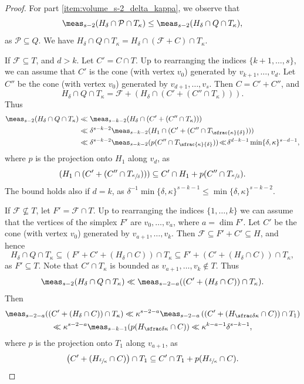 \begin{proof}
For part \eqref{item:volume_s-2_delta_kappa}, we observe that
\[
\meas_{s-2}(H_\delta\cap \mathcal P \cap T_\kappa) \leq \meas_{s-2}(H_\delta\cap Q \cap T_\kappa),
\]
as $\mathcal P\subseteq Q$.
We have
$
H_\delta\cap Q\cap T_\kappa=H_\delta\cap (\mathcal F+C)\cap T_\kappa.
$

If $\mathcal F\subseteq T$, and $d>k$. Let $C'=C\cap T$. Up to rearranging the indices $\{k+1,\dots,s\}$, we can assume that $C'$ is the cone (with vertex $v_0$) generated by $v_{k+1},\dots,v_{d}$. Let $C''$ be the cone (with vertex $v_0$) generated by $v_{d+1},\dots,v_s$. Then $C=C'+C''$, and
\[
H_\delta\cap Q\cap T_\kappa=\mathcal F+(H_\delta\cap (C'+(C''\cap T_\kappa))).
\]
Thus
\begin{align*}
\meas_{s-2}(H_\delta\cap Q\cap T_\kappa)
&\ll\meas_{s-k-2}(H_\delta\cap (C'+(C''\cap T_\kappa)))\\
&\ll \delta^{s-k-2}\meas_{s-k-2}(H_1\cap (C'+(C''\cap T_{\sfrac{\kappa}{\delta}})))\\
&\ll \delta^{s-k-2}\meas_{s-k-2}(p(C''\cap T_{\sfrac{\kappa}{\delta}}))
\!\ll\! \delta^{d-k-1}\min\{\delta,\kappa\}^{s-d-1},
\end{align*}
where $p$ is the projection onto $H_1$ along $v_{d}$,
as \[
(H_1\cap (C'+(C''\cap T_{\sfrac{\kappa}{\delta}})))\subseteq C'\cap H_1+p(C''\cap T_{\sfrac{\kappa}{\delta}}).
\]
The bound holds also if $d=k$, as $\delta^{-1}\min\{\delta,\kappa\}^{s-k-1}\leq \min\{\delta,\kappa\}^{s-k-2}.$

If $\mathcal F\not\subseteq T$, let $F'=\mathcal F\cap T$. Up to rearranging the indices $\{1,\dots,k\}$ we can assume that the vertices of the simplex $F'$ are $v_0,\dots,v_a$, where $a=\dim F'$.
Let $C'$ be the cone (with vertex $v_0$) generated by $v_{a+1},\dots,v_k$.
Then $\mathcal F\subseteq F'+C'\subseteq H$, and hence
\[
H_\delta\cap Q\cap T_\kappa
\subseteq (F'+C'+(H_\delta\cap C))\cap T_\kappa
\subseteq F'+ (C'+(H_\delta\cap C))\cap T_\kappa,
\]
as $F'\subseteq T$. Note that $C'\cap T_\kappa$ is bounded as $v_{a+1},\dots,v_k\notin T$. Thus
\[
\meas_{s-2}(H_\delta\cap Q\cap T_\kappa)\ll\meas_{s-2-a}((C'+(H_\delta\cap C))\cap T_\kappa).
\]
Then
\begin{multline*}
\meas_{s-2-a}((C'+(H_\delta\cap C))\cap T_\kappa)
\ll \kappa^{s-2-a}\meas_{s-2-a}\left(\left(C'+(H_{{\sfrac \delta \kappa}}\cap C)\right)\cap T_1\right)\\
\ll \kappa^{s-2-a}\meas_{s-k-1}(p(H_{{\sfrac \delta \kappa}}\cap C))
\ll \kappa^{k-a-1}\delta^{s-k-1},
\end{multline*}
where $p$ is the projection onto $T_1$ along $v_{a+1}$,
as \[
\left(C'+(H_{{\sfrac \delta \kappa}}\cap C)\right)\cap T_1\subseteq C'\cap T_1+p(H_{{\sfrac \delta \kappa}}\cap C).
\]


\end{proof}
